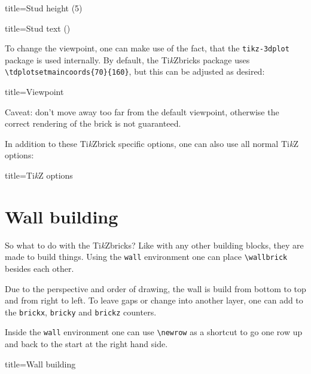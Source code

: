 \documentclass[parskip=half]{scrartcl}
\newcommand{\tikzbrick}{Ti\emph{k}Zbrick\xspace}
\begin{document}
\begin{tcblisting}{title={Stud height (5)}}
\end{tcblisting}
\begin{tcblisting}{title={Stud text ()}}
\end{tcblisting}

To change the viewpoint, one can make use of the fact, that the \texttt{tikz-3dplot} package is used internally. By default, the \tikzbrick{}s package uses \lstinline|\tdplotsetmaincoords{70}{160}|, but this can be adjusted as desired:
\begin{tcblisting}{title={Viewpoint}}
\end{tcblisting}
Caveat: don't move away too far from the default viewpoint, otherwise the correct rendering of the brick is not guaranteed. 

In addition to these \tikzbrick specific options, one can also use all normal Ti\emph{k}Z options:
\begin{tcblisting}{title={Ti\emph{k}Z options}}
\end{tcblisting}

\section{Wall building}

So what to do with the \tikzbrick{}s? Like with any other building blocks, they are made to build things. Using the \lstinline|wall| environment one can place \lstinline|\wallbrick| besides each other. 

Due to the perspective and order of drawing, the wall is build from bottom to top and from right to left. To leave gaps or change into another layer, one can add to the \lstinline|brickx|, \lstinline|bricky| and \lstinline|brickz| counters. 

Inside the \lstinline|wall| environment one can use \lstinline|\newrow| as a shortcut to go one row up and back to the start at the right hand side. 
\begin{tcblisting}{title={Wall building}}
\begin{wall}
  \addtocounter{brickx}{1}
  \newrow
\end{wall}
\end{tcblisting}
\end{document}

